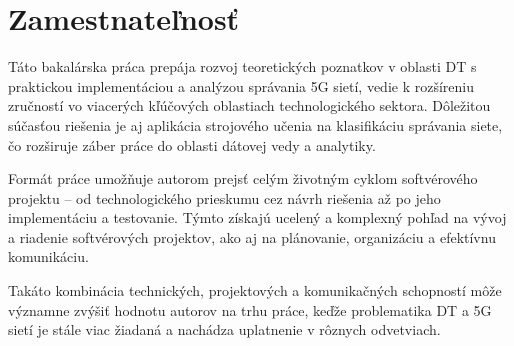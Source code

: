 \section{Zamestnateľnosť}
Táto bakalárska práca prepája rozvoj teoretických poznatkov v oblasti DT s praktickou implementáciou a analýzou správania 5G sietí, vedie k rozšíreniu zručností vo viacerých kľúčových oblastiach technologického sektora. Dôležitou súčasťou riešenia je aj aplikácia strojového učenia na klasifikáciu správania siete, čo rozširuje záber práce do oblasti dátovej vedy a analytiky.

Formát práce umožňuje autorom prejsť celým životným cyklom softvérového projektu – od technologického prieskumu cez návrh riešenia až po jeho implementáciu a testovanie. Týmto získajú ucelený a komplexný pohľad na vývoj a riadenie softvérových projektov, ako aj na plánovanie, organizáciu a efektívnu komunikáciu.

Takáto kombinácia technických, projektových a komunikačných schopností môže významne zvýšiť hodnotu autorov na trhu práce, keďže problematika DT a 5G sietí je stále viac žiadaná a nachádza uplatnenie v rôznych odvetviach.